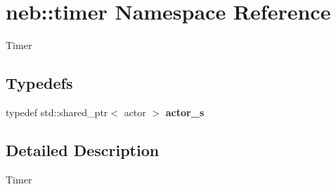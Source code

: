 \hypertarget{namespaceneb_1_1timer}{\section{neb\-:\-:timer \-Namespace \-Reference}
\label{namespaceneb_1_1timer}
}


\-Timer  


\subsection*{\-Typedefs}
\begin{DoxyCompactItemize}
\item 
\hypertarget{namespaceneb_1_1timer_a85f47de65beb55ac71e55979e725ba89}{typedef std\-::shared\-\_\-ptr$<$ actor $>$ {\bfseries actor\-\_\-s}}\label{namespaceneb_1_1timer_a85f47de65beb55ac71e55979e725ba89}

\end{DoxyCompactItemize}


\subsection{\-Detailed \-Description}
\-Timer 